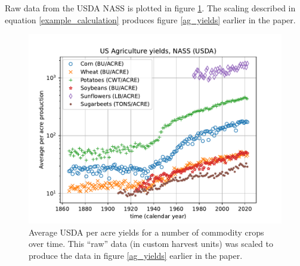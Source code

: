 \documentclass[11pt,letter]{article}
\begin{document}
Raw data from the USDA NASS is plotted in figure \ref{raw_production_per_acre}.  The scaling described in equation \ref{example_calculation} produces figure \ref{ag_yields} earlier in the paper.
\begin{figure}[ht!]
\centering
\includegraphics[width=\columnwidth]{raw_production_per_acre.pdf}
\caption{
Average USDA per acre yields for a number of commodity crops over time.  This ``raw'' data (in custom harvest units) was scaled to produce the data in figure \ref{ag_yields} earlier in the paper. 
}
\label{raw_production_per_acre}
\end{figure}
\end{document}
